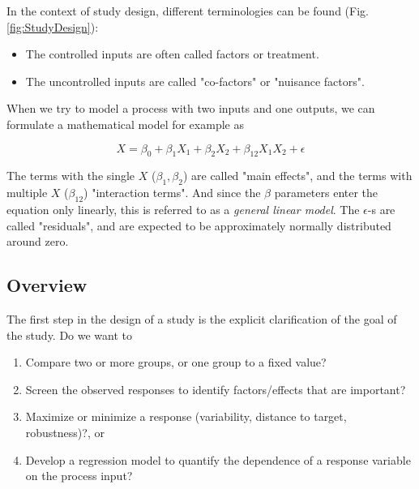 In the context of study design, different terminologies can be found (Fig. \ref{fig:StudyDesign}):

\begin{itemize}
    \item{The controlled inputs are often called \glspl{factor} or
            \gls{treatment}.}
    \item{The uncontrolled inputs are called "co-factors" or
            "nuisance factors".}
\end{itemize}

When we try to model a process with two inputs and one outputs, we can
formulate a mathematical model for example as

\begin{equation}
    X = \beta_0 + \beta_1 X_1 + \beta_2 X_2 + \beta_{12} X_1 X_2 + \epsilon
\end{equation}

The terms with the single $X$ ($\beta_1, \beta_2$) are called "main effects", and the terms with multiple $X$  ($\beta_{12}$) "interaction terms". And since the $\beta$
parameters enter the equation only linearly, this is referred to as a \emph{general linear model}. The $\epsilon$-s are called "\glspl{residual}", and are expected to be approximately normally distributed around zero.

\subsection{Overview}

The first step in the design of a study is the explicit clarification of the goal of the study. Do we want to

\begin{enumerate}
    \item{Compare two or more groups, or one group to a fixed value?}
    \item{Screen the observed responses to identify
            factors/effects that are important?}
    \item{Maximize or minimize a response (variability, distance to target,
            robustness)?, or}
    \item{Develop a regression model to quantify the dependence of a
            response variable on the process input?}
\end{enumerate}

